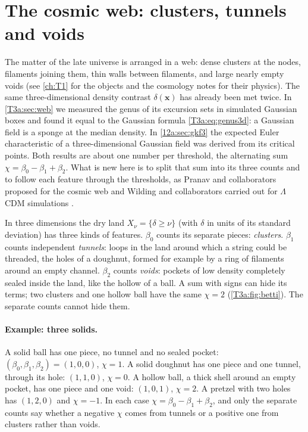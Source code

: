 \section{The cosmic web: clusters, tunnels and voids}
\label{12b:sec:web}

The matter of the late universe is arranged in a web: dense clusters at the nodes, filaments joining them, thin
walls between filaments, and large nearly empty voids (see \cref{ch:T1} for the objects and the cosmology notes for
their physics). The same three-dimensional density contrast $\delta(\bm x)$ has already been met twice. In
\cref{T3a:sec:web} we measured the genus of its excursion sets in simulated Gaussian boxes and found it equal to the
Gaussian formula \cref{T3a:eq:genus3d}: a Gaussian field is a sponge at the median density. In \cref{12a:sec:gkf3}
the expected Euler characteristic of a three-dimensional Gaussian field was derived from its critical points. Both
results are about one number per threshold, the alternating sum $\chi=\beta_0-\beta_1+\beta_2$. What is new here is
to split that sum into its three counts and to follow each feature through the thresholds, as Pranav and
collaborators proposed for the cosmic web \cite{Pranav2017} and Wilding and collaborators carried out for $\Lambda$CDM
simulations \cite{Wilding2021}.

In three dimensions the dry land $X_\nu=\{\delta\geq\nu\}$ (with $\delta$ in units of its standard deviation) has
three kinds of features. $\beta_0$ counts its separate pieces: \emph{clusters}. $\beta_1$ counts independent
\emph{tunnels}: loops in the land around which a string could be threaded, the holes of a doughnut, formed for example
by a ring of filaments around an empty channel. $\beta_2$ counts \emph{voids}: pockets of low density completely sealed
inside the land, like the hollow of a ball. A sum with signs can hide its terms; two clusters and one hollow ball have
the same $\chi=2$ (\cref{T3a:fig:betti}). The separate counts cannot hide them.

\paragraph{Example: three solids.} A solid ball has one piece, no tunnel and no sealed pocket: $(\beta_0,\beta_1,\beta_2)=
(1,0,0)$, $\chi=1$. A solid doughnut has one piece and one tunnel, through its hole: $(1,1,0)$, $\chi=0$. A hollow ball, a
thick shell around an empty pocket, has one piece and one void: $(1,0,1)$, $\chi=2$. A pretzel with two holes has
$(1,2,0)$ and $\chi=-1$. In each case $\chi=\beta_0-\beta_1+\beta_2$, and only the separate counts say whether a
negative $\chi$ comes from tunnels or a positive one from clusters rather than voids.

